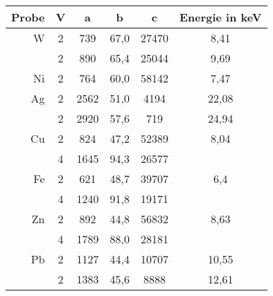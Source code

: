 \begin{tabular}{rccccc}
\toprule
Probe&V&a&b&c&Energie in keV\\
\midrule
W&2&739&67,0&27470&8,41\\
&2&890&65,4&25044&9,69\\
Ni&2&764&60,0&58142&7,47\\
Ag&2&2562&51,0&4194&22,08\\
&2&2920&57,6&719&24,94\\
Cu&2&824&47,2&52389&8,04\\
&4&1645&94,3&26577&\\
Fe&2&621&48,7&39707&6,4\\
&4&1240&91,8&19171&\\
Zn&2&892&44,8&56832&8,63\\
&4&1789&88,0&28181&\\
Pb&2&1127&44,4&10707&10,55\\
&2&1383&45,6&8888&12,61\\
\bottomrule
\end{tabular}